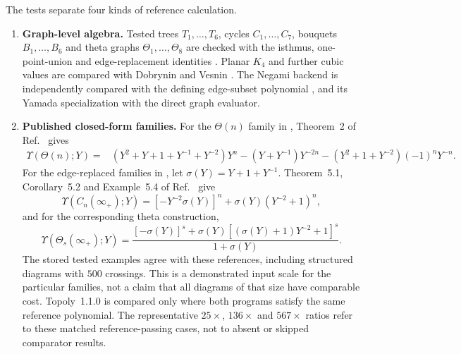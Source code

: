 The tests separate four kinds of reference calculation.
\begin{enumerate}[leftmargin=*,label=\textbf{(\arabic*)}]
\item \textbf{Graph-level algebra.} Tested trees $T_1,\ldots,T_6$, cycles $C_1,\ldots,C_7$, bouquets $B_1,\ldots,B_6$ and theta graphs $\Theta_1,\ldots,\Theta_8$ are checked with the isthmus, one-point-union and edge-replacement identities \cite{kg_yamada1989,kg_li2018yamada}. Planar $K_4$ and further cubic values are compared with Dobrynin and Vesnin \cite{kg_dobrynin1996yamada}. The Negami backend is independently compared with the defining edge-subset polynomial \cite{kg_negami1987}, and its Yamada specialization with the direct graph evaluator.

\item \textbf{Published closed-form families.} For the $\Theta(n)$ family in , Theorem~2 of Ref.~\cite{kg_dobrynin1996yamada} gives
\begin{equation}
\begin{aligned}
\Upsilon(\Theta(n);Y)={}&\left(Y^2+Y+1+Y^{-1}+Y^{-2}\right)Y^n
-\left(Y+Y^{-1}\right)Y^{-2n}
-\left(Y^2+1+Y^{-2}\right)(-1)^nY^{-n}.
\end{aligned}
\label{suppeq:dv_theta_oracle}
\end{equation}
For the edge-replaced families in , let $\sigma(Y)=Y+1+Y^{-1}$. Theorem~5.1, Corollary~5.2 and Example~5.4 of Ref.~\cite{kg_li2018yamada} give
\begin{equation}
\Upsilon\!\left(C_n(\infty_+);Y\right)=\left[-Y^{-2}\sigma(Y)\right]^n+\sigma(Y)\left(Y^{-2}+1\right)^n,
\label{suppeq:li_cycle_oracle}
\end{equation}
and for the corresponding theta construction,
\begin{equation}
\Upsilon\!\left(\Theta_s(\infty_+);Y\right)=\frac{[-\sigma(Y)]^s+\sigma(Y)\left[(\sigma(Y)+1)Y^{-2}+1\right]^s}{1+\sigma(Y)}.
\label{suppeq:li_theta_oracle}
\end{equation}
The stored tested examples agree with these references, including structured diagrams with $500$ crossings. This is a demonstrated input scale for the particular families, not a claim that all diagrams of that size have comparable cost. Topoly~1.1.0 \cite{kg_topoly2021} is compared only where both programs satisfy the same reference polynomial. The representative $25\times$, $136\times$ and $567\times$ ratios refer to these matched reference-passing cases, not to absent or skipped comparator results.


\end{enumerate}
